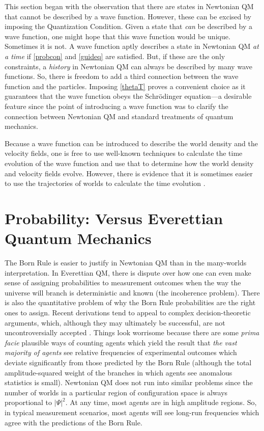 \documentclass[12pt,secnumarabic,balancelastpage,amsmath,amssymb,nofootinbib]{article}
\begin{document}
This section began with the observation that there are states in Newtonian QM that cannot be described by a wave function.  However, these can be excised by imposing the Quantization Condition.  Given a state that \emph{can} be described by a wave function, one might hope that this wave function would be unique.  Sometimes it is not.  A wave function aptly describes a state in Newtonian QM \emph{at a time} if \eqref{probcon} and \eqref{guideq} are satisfied.  But, if these are the only constraints, a \emph{history} in Newtonian QM can always be described by many wave functions.  So, there is freedom to add a third connection between the wave function and the particles.  Imposing \eqref{thetaT} proves a convenient choice as it guarantees that the wave function obeys the Schr\"{o}dinger equation---a desirable feature since the point of introducing a wave function was to clarify the connection between Newtonian QM and standard treatments of quantum mechanics.

Because a wave function can be introduced to describe the world density and the velocity fields, one is free to use well-known techniques to calculate the time evolution of the wave function and use that to determine how the world density and velocity fields evolve.  However, there is evidence that it is sometimes easier to use the trajectories of worlds to calculate the time evolution \citep{wyatt2005, HDW}.

\section{Probability: Versus Everettian Quantum Mechanics}\label{probEQM}

The Born Rule is easier to justify in Newtonian QM than in the many-worlds interpretation.  In Everettian QM, there is dispute over how one can even make sense of assigning probabilities to measurement outcomes when the way the universe will branch is deterministic and known (the incoherence problem).  There is also the quantitative problem of why the Born Rule probabilities are the right ones to assign.  Recent derivations tend to appeal to complex decision-theoretic arguments, which, although they may ultimately be successful, are not uncontroversially accepted \citep{MWbook}.  Things look worrisome because there are some \emph{prima facie} plausible ways of counting agents which yield the result that \emph{the vast majority of agents} see relative frequencies of experimental outcomes which deviate significantly from those predicted by the Born Rule (although the total amplitude-squared weight of the branches in which agents see anomalous statistics is small).  Newtonian QM does not run into similar problems since the number of worlds in a particular region of configuration space is always proportional to $|\Psi|^2$.  At any time, most agents are in high amplitude regions.  So, in typical measurement scenarios, most agents will see long-run frequencies which agree with the predictions of the Born Rule.
\end{document}
